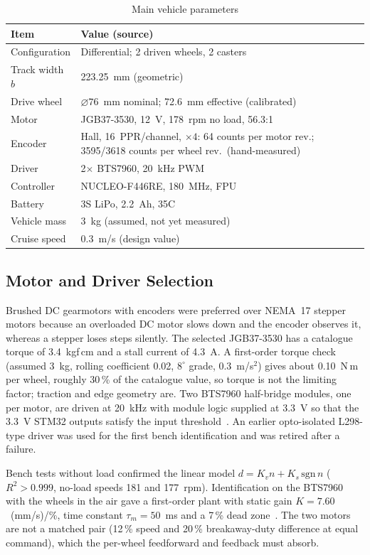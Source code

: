 \documentclass[conference]{IEEEtran}\newcommand{\haveieee}{}%
\begin{document}
\begin{table}[!t]
\caption{Main vehicle parameters}
\label{tab:params}
\centering\footnotesize
\setlength{\tabcolsep}{3pt}
\begin{tabular}{@{}p{2.6cm}p{5.0cm}@{}}
\toprule
\textbf{Item} & \textbf{Value (source)}\\
\midrule
Configuration & Differential; 2 driven wheels, 2 casters\\
Track width $b$ & 223.25~mm (geometric)\\
Drive wheel & $\varnothing 76$~mm nominal; 72.6~mm effective (calibrated)\\
Motor & JGB37-3530, 12~V, 178~rpm no load, 56.3:1\\
Encoder & Hall, 16~PPR/channel, $\times4$: 64 counts per motor rev.; 3595/3618 counts per wheel rev.\ (hand-measured)\\
Driver & 2$\times$ BTS7960, 20~kHz PWM\\
Controller & NUCLEO-F446RE, 180~MHz, FPU\\
Battery & 3S LiPo, 2.2~Ah, 35C\\
Vehicle mass & 3~kg (assumed, not yet measured)\\
Cruise speed & 0.3~m/s (design value)\\
\bottomrule
\end{tabular}
\end{table}

\subsection{Motor and Driver Selection}
Brushed DC gearmotors with encoders were preferred over NEMA~17 stepper motors because an overloaded DC motor slows down and the encoder observes it, whereas a stepper loses steps silently. The selected JGB37-3530 has a catalogue torque of 3.4~kgf\,cm and a stall current of 4.3~A. A first-order torque check (assumed 3~kg, rolling coefficient 0.02, $8^\circ$ grade, 0.3~m/s$^2$) gives about 0.10~N\,m per wheel, roughly 30\,\% of the catalogue value, so torque is not the limiting factor; traction and edge geometry are. Two BTS7960 half-bridge modules, one per motor, are driven at 20~kHz with module logic supplied at 3.3~V so that the 3.3~V STM32 outputs satisfy the input threshold~\cite{bts7960}. An earlier opto-isolated L298-type driver was used for the first bench identification and was retired after a failure.

Bench tests without load confirmed the linear model $d=K_v n+K_s\,\mathrm{sgn}\,n$ ($R^2>0.999$, no-load speeds 181 and 177~rpm). Identification on the BTS7960 with the wheels in the air gave a first-order plant with static gain $K=7.60$~(mm/s)/\%, time constant $\tau_m=50$~ms and a 7\,\% dead zone~\cite{techref}. The two motors are not a matched pair (12\,\% speed and 20\,\% breakaway-duty difference at equal command), which the per-wheel feedforward and feedback must absorb.
\end{document}
